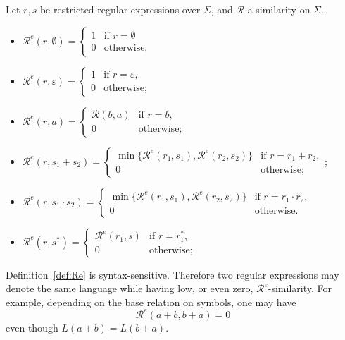 \begin{definition}\label{def:Re}
Let $r,s$ be restricted regular expressions over $\Sigma$, and $\mathcal{R}$ a similarity on $\Sigma$.
\begin{itemize}
\item $\mathcal{R}^e(r,\emptyset)=
\begin{cases}
1 & \text{if } r=\emptyset\\
0 & \text{otherwise;}
\end{cases}$
\item $\mathcal{R}^e(r,\varepsilon)=
\begin{cases}
1 & \text{if } r=\varepsilon,\\
0 & \text{otherwise;}
\end{cases}$
\item $\mathcal{R}^e(r,a)=\begin{cases}
\mathcal{R}(b,a) & \text{if } r=b,\\
0 & \text{otherwise;}
\end{cases}$
\item $\mathcal{R}^e(r,s_1+s_2)=\begin{cases}
\min\{\mathcal{R}^e(r_1,s_1),\mathcal{R}^e(r_2,s_2)\}& \text{if } r=r_1+r_2,\\
0 & \text{otherwise;}
\end{cases}$;

\item $\mathcal{R}^e(r,s_1\cdot s_2)=\begin{cases}
\min\{\mathcal{R}^e(r_1,s_1),\mathcal{R}^e(r_2,s_2)\}
& \text{if } r=r_1\cdot r_2,\\
0 & \text{otherwise.}
\end{cases}$

\item $\mathcal{R}^e(r,s^\ast)=\begin{cases}
\mathcal{R}^e(r_1,s) & \text{if } r=r_1^\ast,\\
0 & \text{otherwise;}
\end{cases}$

\end{itemize}
\end{definition}


\begin{remark}\label{rem:Re-syntax-sensitive}
Definition~\ref{def:Re} is syntax-sensitive.
Therefore two regular expressions may denote the same language while having low, or even zero, $\mathcal{R}^e$-similarity.
For example, depending on the base relation on symbols, one may have
\[
\mathcal{R}^e(a+b,b+a)=0
\]
even though $L(a+b)=L(b+a)$.
\end{remark}


